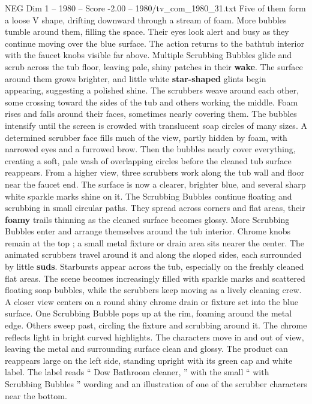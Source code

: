 \begin{textsample}{NEG Dim 1 – 1980 – Score -2.00 – 1980/tv\_com\_1980\_31.txt}
Five of them form a loose V shape, drifting downward through a stream of foam.
More bubbles tumble around them, filling the space.
Their eyes look alert and busy as they continue moving over the blue surface.
The action returns to the bathtub interior with the faucet knobs visible far above.
Multiple Scrubbing Bubbles glide and scrub across the tub floor, leaving pale, shiny patches in their \textbf{wake}.
The surface around them grows brighter, and little white \textbf{star-shaped} glints begin appearing, suggesting a polished shine.
The scrubbers weave around each other, some crossing toward the sides of the tub and others working the middle.
Foam rises and falls around their faces, sometimes nearly covering them.
The bubbles intensify until the screen is crowded with translucent soap circles of many sizes.
A determined scrubber face fills much of the view, partly hidden by foam, with narrowed eyes and a furrowed brow.
Then the bubbles nearly cover everything, creating a soft, pale wash of overlapping circles before the cleaned tub surface reappears.
From a higher view, three scrubbers work along the tub wall and floor near the faucet end.
The surface is now a clearer, brighter blue, and several sharp white sparkle marks shine on it.
The Scrubbing Bubbles continue floating and scrubbing in small circular paths.
They spread across corners and flat areas, their \textbf{foamy} trails thinning as the cleaned surface becomes glossy.
More Scrubbing Bubbles enter and arrange themselves around the tub interior.
Chrome knobs remain at the top ; a small metal fixture or drain area sits nearer the center.
The animated scrubbers travel around it and along the sloped sides, each surrounded by little \textbf{suds}.
Starbursts appear across the tub, especially on the freshly cleaned flat areas.
The scene becomes increasingly filled with sparkle marks and scattered floating soap bubbles, while the scrubbers keep moving as a lively cleaning crew.
A closer view centers on a round shiny chrome drain or fixture set into the blue surface.
One Scrubbing Bubble pops up at the rim, foaming around the metal edge.
Others sweep past, circling the fixture and scrubbing around it.
The chrome reflects light in bright curved highlights.
The characters move in and out of view, leaving the metal and surrounding surface clean and glossy.
The product can reappears large on the left side, standing upright with its green cap and white label.
The label reads “ Dow Bathroom cleaner, ” with the small “ with Scrubbing Bubbles ” wording and an illustration of one of the scrubber characters near the bottom.

\end{textsample}
